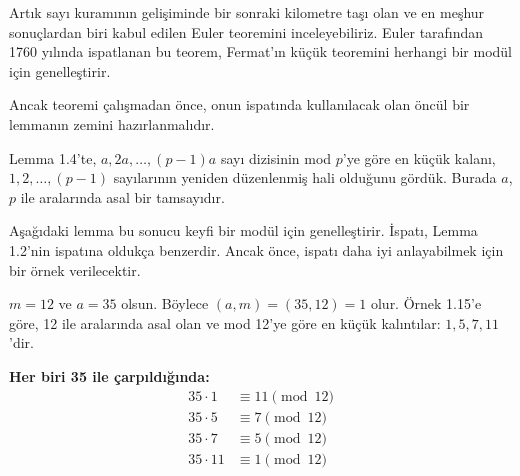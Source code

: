 \documentclass[12pt]{article}
\begin{document}
\vspace{2em}

\begin{tcolorbox}[colback=blue!5, colframe=blue!60!black, title=\textbf{Euler Teoremi'ne Giriş}, fonttitle=\bfseries, sharp corners]
Artık sayı kuramının gelişiminde bir sonraki kilometre taşı olan ve en meşhur sonuçlardan biri kabul edilen Euler teoremini inceleyebiliriz. Euler tarafından 1760 yılında ispatlanan bu teorem, Fermat'ın küçük teoremini herhangi bir modül için genelleştirir.

Ancak teoremi çalışmadan önce, onun ispatında kullanılacak olan öncül bir lemmanın zemini hazırlanmalıdır.

Lemma 1.4'te, $a, 2a, \ldots, (p-1)a$ sayı dizisinin mod $p$'ye göre en küçük kalanı, $1, 2, \ldots, (p-1)$ sayılarının yeniden düzenlenmiş hali olduğunu gördük. Burada $a$, $p$ ile aralarında asal bir tamsayıdır. 

Aşağıdaki lemma bu sonucu keyfi bir modül için genelleştirir. İspatı, Lemma 1.2'nin ispatına oldukça benzerdir. Ancak önce, ispatı daha iyi anlayabilmek için bir örnek verilecektir.
\end{tcolorbox}

\vspace{2em}

\begin{tcolorbox}[colback=gray!10, colframe=black, title=\textbf{Örnek 1.21: Mod 12'de En Küçük Kalıntılar}, fonttitle=\bfseries, sharp corners]
$m = 12$ ve $a = 35$ olsun. Böylece $(a, m) = (35, 12) = 1$ olur. Örnek 1.15'e göre, 12 ile aralarında asal olan ve mod 12'ye göre en küçük kalıntılar: $1, 5, 7, 11$'dir.

\textbf{Her biri 35 ile çarpıldığında:}
\begin{align*}
35 \cdot 1 &\equiv 11 \pmod{12} \\
35 \cdot 5 &\equiv 7 \pmod{12} \\
35 \cdot 7 &\equiv 5 \pmod{12} \\
35 \cdot 11 &\equiv 1 \pmod{12}
\end{align*}
\end{tcolorbox}

\vspace{2em}
\end{document}
